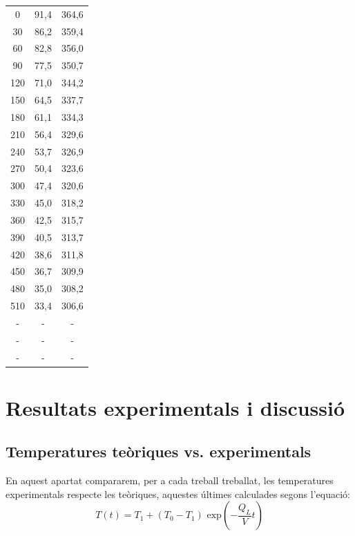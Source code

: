 \documentclass[10pt, twoside]{article}
\begin{document}
\begin{table}[H]
\begin{minipage}{0.3\textwidth}
\begin{tabular}{ccc}
            \midrule
            0   & 91,4 & 364,6 \\
            30  & 86,2 & 359,4 \\
            60  & 82,8 & 356,0 \\
            90  & 77,5 & 350,7 \\
            120 & 71,0 & 344,2 \\
            150 & 64,5 & 337,7 \\
            180 & 61,1 & 334,3 \\
            210 & 56,4 & 329,6 \\
            240 & 53,7 & 326,9 \\
            270 & 50,4 & 323,6 \\
            300 & 47,4 & 320,6 \\
            330 & 45,0 & 318,2 \\
            360 & 42,5 & 315,7 \\
            390 & 40,5 & 313,7 \\
            420 & 38,6 & 311,8 \\
            450 & 36,7 & 309,9 \\
            480 & 35,0 & 308,2 \\
            510 & 33,4 & 306,6 \\
            - & - & - \\
            - & - & - \\
            - & - & - \\
            \bottomrule
        \end{tabular}
        
        \label{tabla:muestra3}
    \end{minipage}
\end{table}

\section{Resultats experimentals i discussió}

\subsection{Temperatures teòriques vs. experimentals}
En aquest apartat compararem, per a cada treball treballat, les temperatures experimentals respecte les teòriques, aquestes últimes calculades segons l'equació:
\begin{equation}
    T(t)=T_1+(T_0-T_1)\text{ exp}\left(-\frac{Q_L}{V}t\right)
\end{equation}
\end{document}

